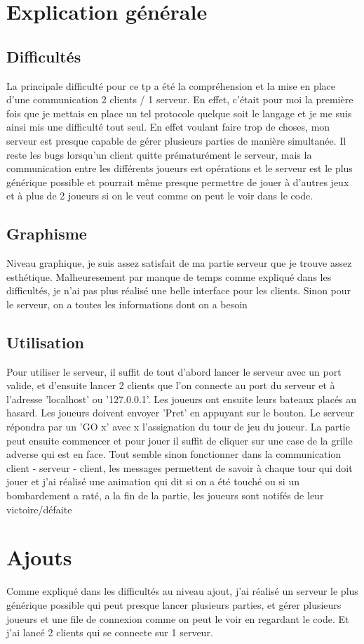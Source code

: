 \documentclass[a4paper]{article}
\date{19 Janvier 2017}
\begin{document}
\entete

\section{Explication générale}

\subsection{Difficultés}

La principale difficulté pour ce tp a été la compréhension et la mise en place d'une communication 2 clients / 1 serveur. En effet, c'était pour moi la première fois que je mettais en place un tel protocole quelque soit le langage et je me suis ainsi mis une difficulté tout seul. En effet voulant faire trop de choses, mon serveur est presque capable de gérer plusieurs parties de manière simultanée. Il reste les bugs lorsqu'un client quitte prématurément le serveur, mais la communication entre les différents joueurs est opérations et le serveur est le plus générique possible et pourrait même presque permettre de jouer à d'autres jeux et à plus de 2 joueurs si on le veut comme on peut le voir dans le code.

\subsection{Graphisme}

Niveau graphique, je suis assez satisfait de ma partie serveur que je trouve assez esthétique. Malheuresement par manque de temps comme expliqué dans les difficultés, je n'ai pas plus réalisé une belle interface pour les clients.
Sinon pour le serveur, on a toutes les informations dont on a besoin


\subsection{Utilisation}

Pour utiliser le serveur, il suffit de tout d'abord lancer le serveur avec un port valide, et d'ensuite lancer 2 clients que l'on connecte au port du serveur et à l'adresse 'localhost' ou '127.0.0.1'. Les joueurs ont ensuite leurs bateaux placés au hasard. Les joueurs doivent envoyer 'Pret' en appuyant sur le bouton. Le serveur répondra par un 'GO x' avec x l'assignation du tour de jeu du joueur. La partie peut ensuite commencer et pour jouer il suffit de cliquer sur une case de la grille adverse qui est en face.
Tout semble sinon fonctionner dans la communication client - serveur - client, les messages permettent de savoir à chaque tour qui doit jouer et j'ai réalisé une animation qui dit si on a été touché ou si un bombardement a raté, a la fin de la partie, les joueurs sont notifés de leur victoire/défaite

\section{Ajouts}
Comme expliqué dans les difficultés au niveau ajout, j'ai réalisé un serveur le plus générique possible qui peut presque lancer plusieurs parties, et gérer plusieurs joueurs et une file de connexion comme on peut le voir en regardant le code.
Et j'ai lancé 2 clients qui se connecte sur 1 serveur.
\end{document}
